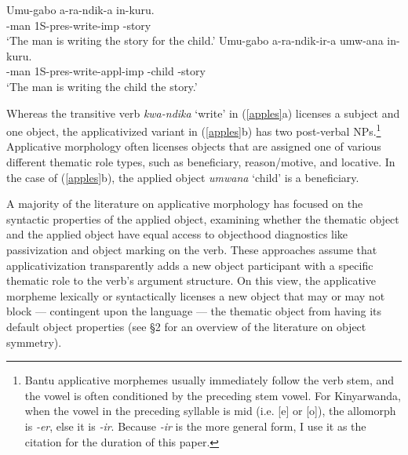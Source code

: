 \documentclass[output=paper]{langsci/langscibook}
\begin{document}
\begin{exe}
\ex\label{apples}
	\begin{xlist}
          \ex\gll Umu-gabo a-ra-ndik-a in-kuru.\\
          {}-man {\sc 1S-pres}-write-{\sc imp} {-}story\\
          \glt `The man is writing the story for the child.'
          \ex\gll Umu-gabo a-ra-ndik-ir-a umw-ana in-kuru.\\
          {}-man {\sc 1S-pres}-write-{\sc appl-imp} {-}child {-}story\\
          \glt `The man is writing the child the story.'
	\end{xlist}
\end{exe} 
%
Whereas the transitive verb \emph{kwa-ndika} `write' in (\ref{apples}a) licenses a subject and one object, the applicativized variant in (\ref{apples}b) has two post-verbal NPs.\footnote{Bantu applicative morphemes usually immediately follow  the verb stem, and the vowel is often conditioned by the preceding stem vowel. For Kinyarwanda, when the vowel in the preceding syllable is mid (i.e. [e] or [o]), the allomorph is \emph{-er}, else it is \emph{-ir}. Because \emph{-ir} is the more general form, I use it as the citation for the duration of this paper.}  Applicative morphology often licenses objects that are assigned one of various different thematic role types, such as {\sc beneficiary, reason/motive,} and {\sc locative}. In the case of (\ref{apples}b), the applied object  \emph{umwana} `child' is a {\sc beneficiary}.

 A majority of the literature on applicative morphology has focused on the syntactic properties of the applied object, examining whether the thematic object and the applied object have equal access to objecthood diagnostics like passivization and object marking on the verb. These approaches assume that applicativization transparently adds a new object participant with a specific thematic role to the verb's argument structure.  On this view, the applicative morpheme lexically or syntactically licenses a new object that may or may not block --- contingent upon the language ---  the thematic object from having its default object properties (see \S2 for an overview of the literature on object symmetry).
\end{document}
